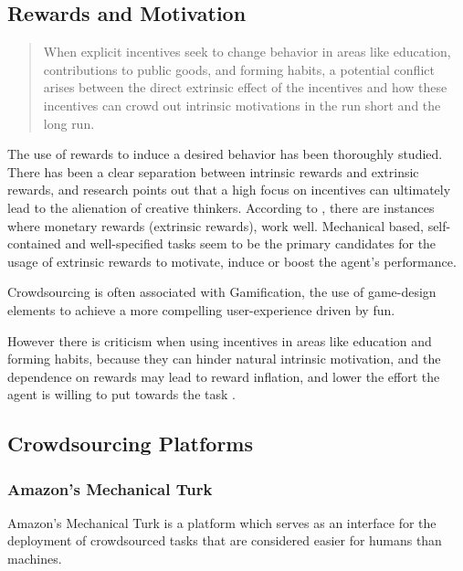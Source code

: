 \documentclass[letterpaper]{article}
\begin{document}
\subsection{Rewards and Motivation}



\begin{quote}
When explicit incentives seek to change behavior in areas like education, contributions to public goods, and forming habits, a potential conflict arises between
the direct extrinsic effect of the incentives and how these incentives can crowd
out intrinsic motivations in the run short and the long run.
\end{quote}
\cite{Gneezy2011}




The use of rewards to induce a desired behavior has been thoroughly studied. 
There has been a clear separation between intrinsic rewards and extrinsic rewards, and research points out that a high focus on incentives can ultimately lead to the alienation of creative thinkers. 
According to \cite{Gneezy2011}, there are instances where monetary rewards (extrinsic rewards), work well. Mechanical based, self-contained and well-specified tasks seem to be the primary candidates for the usage of extrinsic rewards to motivate, induce or boost the agent's performance\cite{Ariely2009}.

Crowdsourcing is often associated with Gamification, the use of game-design elements to achieve a more compelling user-experience driven by fun.


However there is criticism when using incentives in areas like education and forming habits, because they can hinder natural intrinsic motivation, and the dependence on rewards may lead to reward inflation, and lower the effort the agent is willing to put towards the task \cite{Irlenbusch2005}. 





\subsection{Crowdsourcing Platforms}


\subsubsection{Amazon’s Mechanical Turk}

Amazon's Mechanical Turk is a platform which serves as an interface for the deployment of crowdsourced tasks that are considered easier for humans than machines. 
\end{document}
